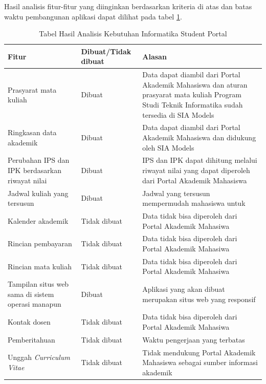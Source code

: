 Hasil analisis fitur-fitur yang diinginkan berdasarkan kriteria di atas dan batas waktu pembangunan aplikasi dapat dilihat pada tabel \ref{tab:3_hasil_fitur}.
\begin{table}[H]
	\centering
		\caption{Tabel Hasil Analisis Kebutuhan Informatika Student Portal}
    \begin{tabular}{|p{4.5cm}|p{2.5cm}|p{8cm}|}
		\hline
		Fitur & Dibuat/Tidak dibuat & Alasan\\
		\hline
		Prasyarat mata kuliah                             & Dibuat       & Data dapat diambil dari Portal Akademik Mahasiswa dan aturan prasyarat mata kuliah Program Studi Teknik Informatika sudah tersedia di SIA Models                   \\
		\hline
    Ringkasan data akademik                               & Dibuat       & Data dapat diambil dari Portal Akademik Mahasiswa dan didukung oleh SIA Models                        \\
		\hline
    Perubahan IPS dan IPK berdasarkan riwayat nilai   & Dibuat       &  IPS dan IPK dapat dihitung melalui riwayat nilai yang dapat diperoleh dari Portal Akademik Mahasiswa \\
		\hline
    Jadwal kuliah yang tersusun                       & Dibuat       & Jadwal yang tersusun mempermudah mahasiswa untuk                                                      \\
		\hline
    Kalender akademik                                 & Tidak dibuat & Data tidak bisa diperoleh dari Portal Akademik Mahasiwa                                               \\
		\hline
    Rincian pembayaran                                & Tidak dibuat & Data tidak bisa diperoleh dari Portal Akademik Mahasiwa                                               \\
		\hline
    Rincian mata kuliah                               & Tidak dibuat & Data tidak bisa diperoleh dari Portal Akademik Mahasiwa                                               \\
		\hline
    Tampilan situs web sama di sistem operasi manapun & Dibuat       & Aplikasi yang akan dibuat merupakan situs web yang responsif                                          \\
		\hline
    Kontak dosen                                      & Tidak dibuat & Data tidak bisa diperoleh dari Portal Akademik Mahasiwa                                               \\
		\hline
    Pemberitahuan                                     & Tidak dibuat & Waktu pengerjaan yang terbatas                                                                        \\
		\hline
    Unggah \textit{Curriculum Vitae}                           & Tidak dibuat & Tidak mendukung Portal Akademik Mahasiswa sebagai sumber informasi akademik                           \\
		\hline
		\end{tabular}
	\label{tab:3_hasil_fitur}
\end{table}



